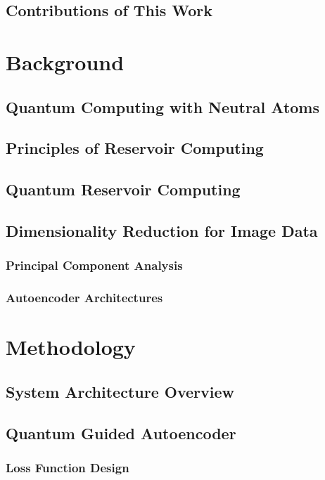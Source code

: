 \documentclass[conference]{IEEEtran}
\begin{document}
\subsection{Contributions of This Work}

\section{Background}
\subsection{Quantum Computing with Neutral Atoms}
\subsection{Principles of Reservoir Computing}
\subsection{Quantum Reservoir Computing}
\subsection{Dimensionality Reduction for Image Data}
\subsubsection{Principal Component Analysis}
\subsubsection{Autoencoder Architectures}

\section{Methodology}
\subsection{System Architecture Overview}
\subsection{Quantum Guided Autoencoder}
\subsubsection{Loss Function Design}
\end{document}
